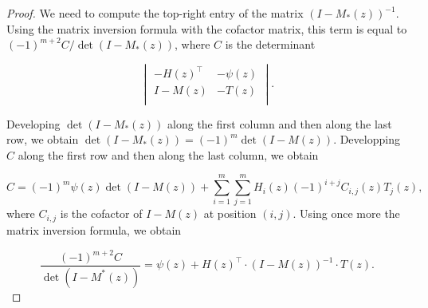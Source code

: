 \documentclass{article}
\begin{document}
\begin{proof}
We need to compute the top-right entry of the matrix $(I-M_*(z))^{-1}$.
Using the matrix inversion formula with the cofactor matrix, this term is
equal to $(-1)^{m+2}C/\det(I-M_*(z))$, where $C$ is the determinant

\begin{equation*}
\begin{vmatrix}
-H(z)^\top  & -\psi(z) \\
I-M(z) & -T(z)    \\
\end{vmatrix}.
\end{equation*}

Developing $\det(I-M_*(z))$ along the first column and then along the last
row, we obtain $\det(I-M_*(z)) = (-1)^m\det(I-M(z))$. Developping $C$
along the first row and then along the last column, we obtain

\begin{equation*}
C = (-1)^m\psi(z)\det(I-M(z)) +
\sum_{i=1}^m\sum_{j=1}^m H_i(z) (-1)^{i+j} C_{i,j}(z) T_j(z),
\end{equation*}
where $C_{i,j}$ is the cofactor of $I-M(z)$ at position $(i,j)$. Using
once more the matrix inversion formula, we obtain

\begin{equation*}
\frac{(-1)^{m+2}C}{\det(I-M^*(z))} =
\psi(z) + H(z)^\top \cdot (I-M(z))^{-1} \cdot T(z).
\end{equation*}
\end{proof}
\end{document}
